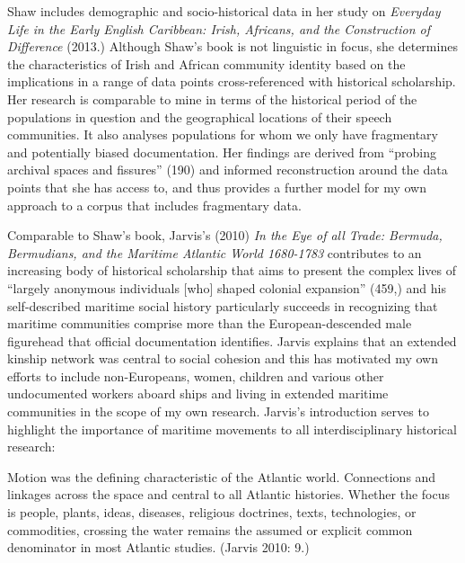 \begin{styleStandard}
Shaw includes demographic and socio-historical data in her study on \textit{Everyday Life in the Early English Caribbean: Irish, Africans, and the Construction of Difference} (2013.) Although Shaw’s book is not linguistic in focus, she determines the characteristics of Irish and African community identity based on the implications in a range of data points cross-referenced with historical scholarship. Her research is comparable to mine in terms of the historical period of the populations in question and the geographical locations of their speech communities. It also analyses populations for whom we only have fragmentary and potentially biased documentation. Her findings are derived from “probing archival spaces and fissures” (190) and informed reconstruction around the data points that she has access to, and thus provides a further model for my own approach to a corpus that includes fragmentary data. 
\end{styleStandard}

\begin{styleStandard}
Comparable to Shaw’s book, Jarvis’s (2010) \textit{In the Eye of all Trade: Bermuda, Bermudians, and the Maritime Atlantic World 1680-1783} contributes to an increasing body of historical scholarship that aims to present the complex lives of “largely anonymous individuals [who] shaped colonial expansion” (459,) and his self-described maritime social history particularly succeeds in recognizing that maritime communities comprise more than the European-descended male figurehead that official documentation identifies. Jarvis explains that an extended kinship network was central to social cohesion and this has motivated my own efforts to include non-Europeans, women, children and various other undocumented workers aboard ships and living in extended maritime communities in the scope of my own research. Jarvis’s introduction serves to highlight the importance of maritime movements to all interdisciplinary historical research: 
\end{styleStandard}

\begin{styleStandard}
Motion was the defining characteristic of the Atlantic world. Connections and linkages across the space and central to all Atlantic histories. Whether the focus is people, plants, ideas, diseases, religious doctrines, texts, technologies, or commodities, crossing the water remains the assumed or explicit common denominator in most Atlantic studies. (Jarvis 2010: 9.)
\end{styleStandard}

